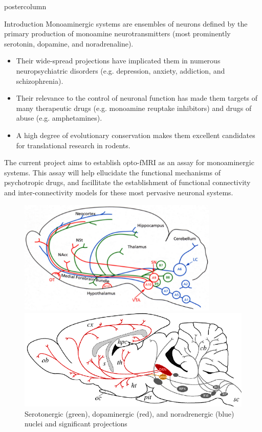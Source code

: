 \documentclass{beamer}
\begin{document}
\begin{frame}
\begin{columns}
\begin{column}{.43\textwidth}
\begin{beamercolorbox}[center]{postercolumn}
\begin{minipage}{.98\textwidth}
{\begin{myblock}{Introduction}
						Monoaminergic systems are ensembles of neurons defined by the primary production of monoamine neurotransmitters (most prominently serotonin, dopamine, and noradrenaline).
						\begin{itemize}
							\item Their wide-spread projections have implicated them in numerous neuropsychiatric disorders (e.g. depression, anxiety, addiction, and schizophrenia).
							\item Their relevance to the control of neuronal function has made them targets of many therapeutic drugs (e.g. monoamine reuptake inhibitors) and drugs of abuse (e.g. amphetamines).
							\item A high degree of evolutionary conservation makes them excellent candidates for translational research in rodents.
						\end{itemize}
						The current project aims to establish opto-fMRI as an assay for monoaminergic systems.
						This assay will help ellucidate the functional mechanisms of psychotropic drugs, and facillitate the establishment of functional connectivity and inter-connectivity models for these most pervasive neuronal systems.
						\vspace{0.4em}
						\begin{figure}
							\begin{minipage}{0.43\textwidth}
								\centering\includegraphics[width=0.85\textwidth]{img/mas.png}
								\caption{Serotonergic (green), dopaminergic (red), and noradrenergic (blue) nuclei and significant projections \cite{Paivi}}
							\end{minipage}
							\hspace{1em}
							\begin{minipage}{0.45\textwidth}
								\centering\includegraphics[width=1\textwidth]{img/drn_mr_p.png}

\end{minipage}
\end{figure}
\end{myblock}}
\end{minipage}
\end{beamercolorbox}
\end{column}
\end{columns}
\end{frame}
\end{document}
